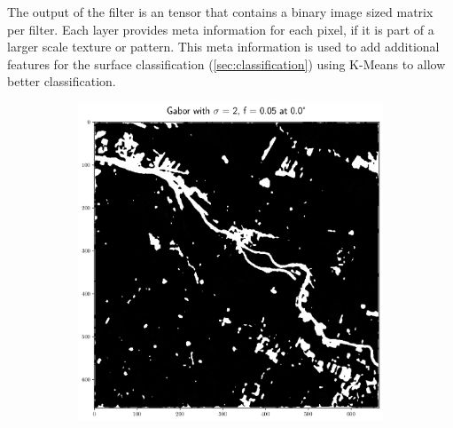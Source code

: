 \documentclass[12pt,a4paper, english,twoside]{article}
\begin{document}
    The output of the filter is an tensor that contains a binary image sized matrix per filter. Each layer provides meta information for each pixel, if it is part of a larger scale texture or pattern. 
    This meta information is used to add additional features for the surface classification (\cref{sec:classification}) using K-Means %
    to allow better classification.%
    \begin{figure}[!htbp]
       \centering
     \begin{subfigure}[b]{0.45\textwidth}
         \centering
         \includegraphics[width=\textwidth]{img/Features_2_005_0.png}
         \label{fig:feat01}
     \end{subfigure}
     \hfill
     \begin{subfigure}[b]{0.45\textwidth}
         \centering

\end{subfigure}
\end{figure}
\end{document}
